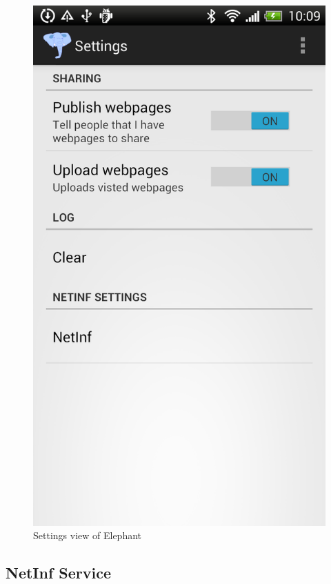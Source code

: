 \begin{figure}[!h]
\centering
\includegraphics[scale=0.2]{img/ele_settings.png}
\caption{Settings view of Elephant}\label{fig:ele_settings}
\end{figure}


\subsection{NetInf Service}

